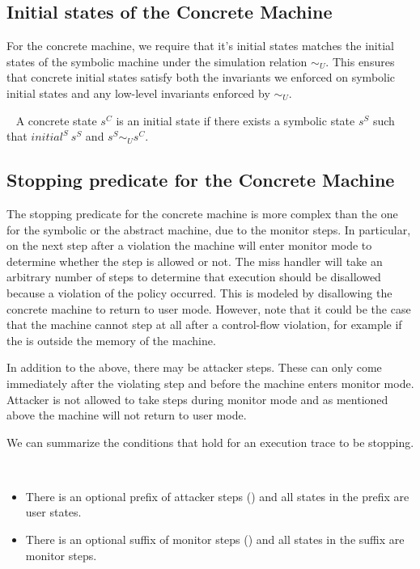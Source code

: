 \subsection{Initial states of the Concrete Machine}
\label{sec:concrete_initial}

For the concrete machine, we require that it's initial states matches
the initial states of the symbolic machine under the simulation
relation $\sim_U$. This ensures that concrete initial states satisfy
both the invariants we enforced on symbolic initial states and any
low-level invariants enforced by $\sim_U$.

\begin{definition}\label{concrete_initia_pred}
  ~ A concrete state $s^C$ is an initial state if there exists a
  symbolic state $s^S$ such that $initial^S ~ s^S$ and $s^S \sim_U
  s^C$.
\end{definition}

\subsection{Stopping predicate for the Concrete Machine}
\label{sec:concrete_stopping}

The stopping predicate for the concrete machine is more complex than
the one for the symbolic or the abstract machine, due to the monitor
steps. In particular, on the next step after a violation the machine
will enter monitor mode to determine whether the step is allowed or
not. The miss handler will take an arbitrary number of steps to
determine that execution should be disallowed because a violation of
the policy occurred. This is modeled by disallowing the concrete
machine to return to user mode.  However, note that it could be the
case that the machine cannot step at all after a control-flow
violation, for example if the \pc is outside the memory of the machine.

In addition to the above, there may be attacker steps. These can only
come immediately after the violating step and before the machine
enters monitor mode. Attacker is not allowed to take steps during
monitor mode and as mentioned above the machine will not return to
user mode.

We can summarize the conditions that hold for an execution trace to
be stopping.

\begin{definition}
\label{concrete_stopping}
~
\begin{itemize}
\item There is an optional prefix of attacker steps () and
  all states in the prefix are user states.
\item There is an optional suffix of monitor steps (\stepn{}{}) and
  all states in the suffix are monitor steps.
\end{itemize}
\end{definition}

